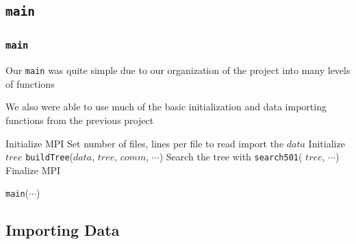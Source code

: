 \documentclass[usernames,dvipsnames]{beamer}
\begin{document}
\subsection{\texttt{main}}

\begin{frame}
	\frametitle{\texttt{main}}
	
	Our \texttt{main} was quite simple due to our organization of the project into many levels of functions
	
	\vspace{10pt}
	
	We also were able to use much of the basic initialization and data importing functions from the previous project
	
	\vspace{10pt}
	
	\begin{algorithm}[H]
		\begin{algorithmic}[1]
			\STATE Initialize MPI
			\STATE Set number of files, lines per file to read
			\STATE import the $data$
			\STATE Initialize $tree$
			\STATE \texttt{buildTree}($data$, $tree$, $comm$, $\cdots$)
			\STATE Search the tree with \texttt{search501}( $tree$, $\cdots$)
			\STATE Finalize MPI
		\end{algorithmic}
	\caption{\texttt{main}($\cdots$)}
	\end{algorithm}
		
\end{frame}

%
%

\subsection{Importing Data}

\end{document}
